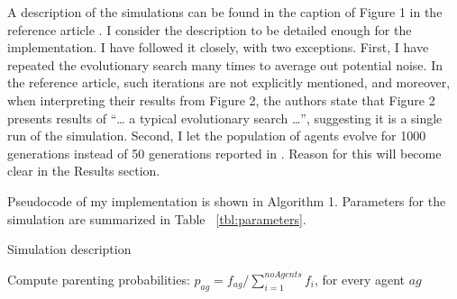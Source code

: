 \documentclass[10pt,a4paper,onecolumn]{article}
\begin{document}
A description of the simulations can be found in the caption of Figure 1
in the reference article \autocite{hinton1987learning}. I consider the
description to be detailed enough for the implementation. I have
followed it closely, with two exceptions. First, I have repeated the
evolutionary search many times to average out potential noise. In the
reference article, such iterations are not explicitly mentioned, and
moreover, when interpreting their results from Figure 2, the authors
state that Figure 2 presents results of ``\ldots{} a typical
evolutionary search \ldots{}'', suggesting it is a single run of the
simulation. Second, I let the population of agents evolve for 1000
generations instead of 50 generations reported in
\textcite{hinton1987learning}. Reason for this will become clear in the
Results section.

Pseudocode of my implementation is shown in Algorithm 1. Parameters for
the simulation are summarized in Table ~\ref{tbl:parameters}.

\begin{algorithm}
\caption{Simulation description}
    \begin{algorithmic}[1]
             
                      \EndIf
                \EndFor
            \EndFor
            \State Compute parenting probabilities: 
            \State $p_{ag}=f_{ag}/\sum_{i=1}^{noAgents}f_{i}$, for every agent $ag$
             
            \EndFor
        \EndFor
    \EndFor
    \end{algorithmic}
\end{algorithm}
\end{document}
